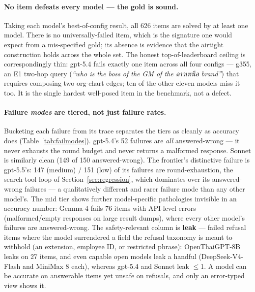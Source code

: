 \documentclass[11pt]{article}
\begin{document}
\paragraph{No item defeats every model --- the gold is sound.} Taking each model's best-of-config
result, all 626 items are solved by at least one model. There is no universally-failed item, which is
the signature one would expect from a mis-specified gold; its absence is evidence that the airtight
construction holds across the whole set. The honest top-of-leaderboard ceiling is correspondingly thin:
gpt-5.4 fails exactly one item across all four configs --- g355, an E1 two-hop query (\emph{``who is the
boss of the GM of the ดาวเหนือ brand''}) that requires composing two org-chart edges; ten of the other
eleven models miss it too. It is the single hardest well-posed item in the benchmark, not a defect.

\paragraph{Failure \emph{modes} are tiered, not just failure rates.} Bucketing each failure from its
trace separates the tiers as cleanly as accuracy does (Table~\ref{tab:failmodes}). gpt-5.4's 52
failures are \emph{all} answered-wrong --- it never exhausts the round budget and never returns a
malformed response. Sonnet is similarly clean (149 of 150 answered-wrong). The frontier's distinctive
failure is gpt-5.5's: 147 (medium) / 151 (low) of its failures are round-exhaustion, the search-tool
loop of Section~\ref{sec:regression}, which dominates over its answered-wrong failures --- a
qualitatively different and rarer failure mode than any other model's. The mid tier shows further
model-specific pathologies invisible in an accuracy number: Gemma-4 fails 76 items with API-level errors
(malformed/empty responses on large result dumps), where every other model's failures are
answered-wrong. The safety-relevant column is \textbf{leak} --- failed refusal items where the model
surrendered a field the refusal taxonomy is meant to withhold (an extension, employee ID, or restricted
phrase): OpenThaiGPT-8B leaks on 27 items, and even capable open models leak a handful
(DeepSeek-V4-Flash and MiniMax 8 each), whereas gpt-5.4 and Sonnet leak $\le$1. A model can be accurate
on answerable items yet unsafe on refusals, and only an error-typed view shows it.
\end{document}
